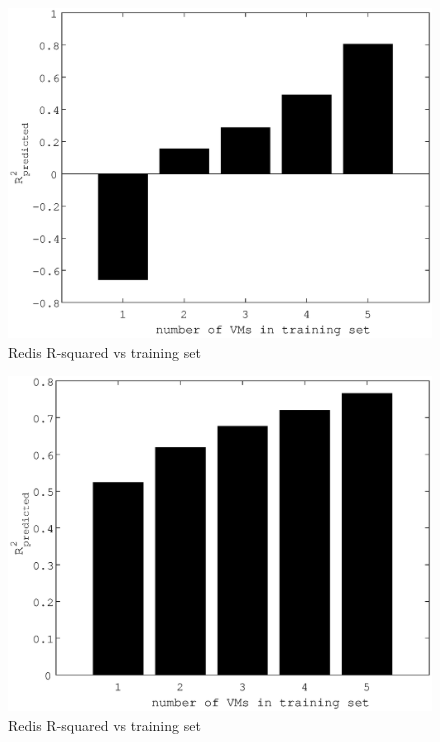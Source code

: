 \documentclass{acm_proc_article-sp}
\begin{document}
\begin{figure}
\centering
\includegraphics[scale = 0.5]{bar_read_avg_latency_r3_2x_r3_x_m3_2x_m3_x_r3__m3_.eps}
\caption{Redis R-squared vs training set}
\label{figure:redisbarread}
\end{figure}

\begin{figure}
\centering
\includegraphics[scale = 0.5]{bar_read_avg_latency_r3_2x_r3__m3_2x_m3__r3_x_m3_x.eps}
\caption{Redis R-squared vs training set}
\label{figure:redisbarread}
\end{figure}

\end{document}

